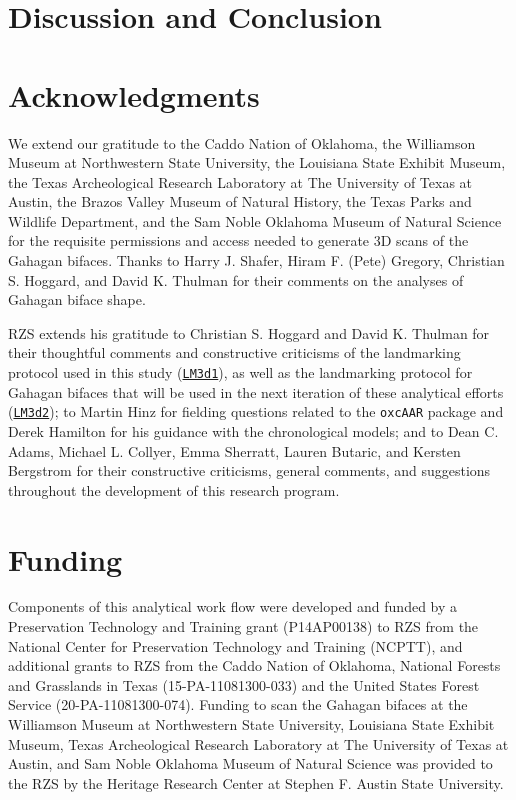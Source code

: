 \documentclass[]{interact}
\theoremstyle{plain}%
\theoremstyle{definition}
\theoremstyle{remark}
\begin{document}
\hypertarget{discussion-and-conclusion}{%
\section{Discussion and Conclusion}\label{discussion-and-conclusion}}

\hypertarget{acknowledgments}{%
\section*{Acknowledgments}\label{acknowledgments}}

We extend our gratitude to the Caddo Nation of Oklahoma, the Williamson
Museum at Northwestern State University, the Louisiana State Exhibit
Museum, the Texas Archeological Research Laboratory at The University of
Texas at Austin, the Brazos Valley Museum of Natural History, the Texas
Parks and Wildlife Department, and the Sam Noble Oklahoma Museum of
Natural Science for the requisite permissions and access needed to
generate 3D scans of the Gahagan bifaces. Thanks to Harry J. Shafer,
Hiram F. (Pete) Gregory, Christian S. Hoggard, and David K. Thulman for
their comments on the analyses of Gahagan biface shape.

RZS extends his gratitude to Christian S. Hoggard and David K. Thulman
for their thoughtful comments and constructive criticisms of the
landmarking protocol used in this study
(\href{https://github.com/aksel-blaise/gahaganmorph2/blob/master/analysis/landmarking-protocol.md}{\texttt{LM3d1}}),
as well as the landmarking protocol for Gahagan bifaces that will be
used in the next iteration of these analytical efforts
(\href{https://seldenlab.github.io/gahaganmorph.3/landmarking-protocol-3d2.html}{\texttt{LM3d2}});
to Martin Hinz for fielding questions related to the \texttt{oxcAAR}
package and Derek Hamilton for his guidance with the chronological
models; and to Dean C. Adams, Michael L. Collyer, Emma Sherratt, Lauren
Butaric, and Kersten Bergstrom for their constructive criticisms,
general comments, and suggestions throughout the development of this
research program.

\hypertarget{funding}{%
\section*{Funding}\label{funding}}

Components of this analytical work flow were developed and funded by a
Preservation Technology and Training grant (P14AP00138) to RZS from the
National Center for Preservation Technology and Training (NCPTT), and
additional grants to RZS from the Caddo Nation of Oklahoma, National
Forests and Grasslands in Texas (15-PA-11081300-033) and the United
States Forest Service (20-PA-11081300-074). Funding to scan the Gahagan
bifaces at the Williamson Museum at Northwestern State University,
Louisiana State Exhibit Museum, Texas Archeological Research Laboratory
at The University of Texas at Austin, and Sam Noble Oklahoma Museum of
Natural Science was provided to the RZS by the Heritage Research Center
at Stephen F. Austin State University.
\end{document}
